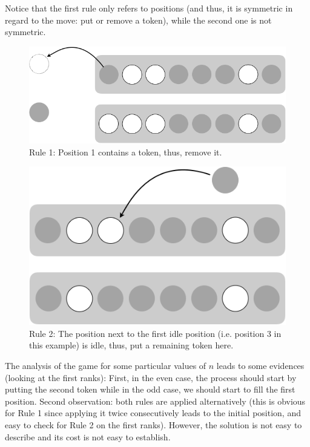 {Notice that the first rule only refers to positions (and thus, it is symmetric in regard to the move: put or remove a token), 
while the second one is not symmetric.

\begin{figure}[h]
\begin{center}
        \includegraphics[scale=0.4]{FiguresMaths/GameTokenRule1.png}
        \caption{Rule 1: Position 1 contains a token, thus, remove it.}
        \label{fig:rule1}
\end{center}
\end{figure}

\begin{figure}[h]
\begin{center}
        \includegraphics[scale=0.4]{FiguresMaths/GameTokenRule2.png}
        \caption{Rule 2: The position next to the first idle position (i.e. position 3 in this example) 
        is idle, thus, put a remaining token here.}
        \label{fig:rule2}
\end{center}
\end{figure}

The analysis of the game for some particular values of $n$ leads to some evidences (looking at the first ranks):
First, in the even case, the process should start by putting the second token while in the odd case, we should start to fill the first position.
Second observation: both rules are applied alternatively (this is obvious for Rule 1 since applying it twice consecutively leads to the initial position, 
and easy to check for Rule 2 on the first ranks). 
However, the solution is not easy to describe and its cost is not easy to establish.

}
